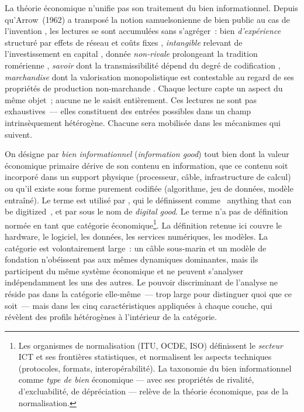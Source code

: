 La théorie économique n'unifie pas son traitement du bien informationnel. Depuis qu'Arrow~(1962) a transposé la notion samuelsonienne de bien public au cas de l'invention \parencite{samuelson_pure_1954,arrow_welfare_1962}, les lectures se sont accumulées sans s'agréger~: bien \emph{d'expérience} structuré par effets de réseau et coûts fixes \parencite{shapiro_information_1999}, \emph{intangible} relevant de l'investissement en capital \parencite{haskel_capitalism_2018}, donnée \emph{non-rivale} prolongeant la tradition romérienne \parencite{jones_nonrivalry_2020}, \emph{savoir} dont la transmissibilité dépend du degré de codification \parencite{cowan_explicit_2000}, \emph{marchandise} dont la valorisation monopolistique est contestable au regard de ses propriétés de production non-marchande \parencite{benkler_wealth_2006,boldrin_against_2008}. Chaque lecture capte un aspect du même objet~; aucune ne le saisit entièrement. Ces lectures ne sont pas exhaustives~--- elles constituent des entrées possibles dans un champ intrinsèquement hétérogène. Chacune sera mobilisée dans les mécanismes qui suivent.

On désigne par \emph{bien informationnel} (\emph{information good}) tout bien dont la valeur économique primaire dérive de son contenu en information, que ce contenu soit incorporé dans un support physique (processeur, câble, infrastructure de calcul) ou qu'il existe sous forme purement codifiée (algorithme, jeu de données, modèle entraîné). Le terme est utilisé par \textcite{shapiro_information_1999}, qui le définissent comme \og~anything that can be digitized~\fg{}, et par \textcite{quah_digital_2003} sous le nom de \emph{digital good}. Le terme n'a pas de définition normée en tant que catégorie économique\footnote{Les organismes de normalisation (ITU, OCDE, ISO) définissent le \emph{secteur} ICT et ses frontières statistiques, et normalisent les aspects techniques (protocoles, formats, interopérabilité). La taxonomie du bien informationnel comme \emph{type de bien} économique --- avec ses propriétés de rivalité, d'excluabilité, de dépréciation --- relève de la théorie économique, pas de la normalisation.}. La définition retenue ici couvre le hardware, le logiciel, les données, les services numériques, les modèles. La catégorie est volontairement large~: un câble sous-marin et un modèle de fondation n'obéissent pas aux mêmes dynamiques dominantes, mais ils participent du même système économique et ne peuvent s'analyser indépendamment les uns des autres. Le pouvoir discriminant de l'analyse ne réside pas dans la catégorie elle-même~--- trop large pour distinguer quoi que ce soit~--- mais dans les cinq caractéristiques appliquées à chaque couche, qui révèlent des profils hétérogènes à l'intérieur de la catégorie.

